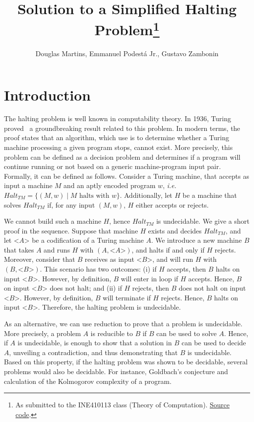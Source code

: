\documentclass[12pt]{article}
\title{Solution to a Simplified Halting Problem\footnote{
    As submitted to the INE410113 class (Theory of Computation). \href{https://github.com/zambonin/ine410113}{Source code}.}}
\author{Douglas Martins\inst{1}, Emmanuel Podestá Jr.\inst{1}, Gustavo Zambonin\inst{1}}
\begin{document}
 

\maketitle

\section{Introduction}\label{sec:intro}

The halting problem is well known in computability theory. In 1936, Turing proved~\cite{Turing:article:1937:jan} a groundbreaking result related to this problem. In modern terms, the proof states that an algorithm, which use is to determine whether a Turing machine processing a given program stops, cannot exist. More precisely, this problem can be defined as a decision problem and determines if a program will continue running or not based on a generic machine-program input pair. Formally, it can be defined as follows. Consider a Turing machine, that accepts as input a machine $M$ and an aptly encoded program $w$, \emph{i.e.} $Halt_{TM} = \{(M, w) \mid M \text{ halts with } w\}$. Additionally, let $H$ be a machine that solves $Halt_{TM}$ if, for any input $(M, w)$, $H$ either accepts or rejects. 

We cannot build such a machine $H$, hence $Halt_{TM}$ is undecidable. We give a short proof in the sequence. Suppose that machine $H$ exists and decides $Halt_{TM}$, and let <$A$> be a codification of a Turing machine $A$. We introduce a new machine $B$ that takes $A$ and runs $H$ with $(A, \text{<}A\text{>})$, and halts if and only if $H$ rejects. Moreover, consider that $B$ receives as input <$B$>, and will run $H$ with $(B, \text{<}B\text{>})$. This scenario has two outcomes: (i) if $H$ accepts, then $B$ halts on input <$B$>. However, by definition, $B$ will enter in loop if $H$ accepts. Hence, $B$ on input <$B$> does not halt; and (ii) if $H$ rejects, then $B$ does not halt on input <$B$>. However, by definition, $B$ will terminate if $H$ rejects. Hence, $B$ halts on input <$B$>. Therefore, the halting problem is undecidable.

As an alternative, we can use reduction to prove that a problem is undecidable. More precisely, a problem $A$ is reducible to $B$ if $B$ can be used to solve $A$. Hence, if $A$ is undecidable, is enough to show that a solution in $B$ can be used to decide $A$, unveiling a contradiction, and thus demonstrating that $B$ is undecidable. Based on this property, if the halting problem was shown to be decidable, several problems would also be decidable. For instance, Goldbach's conjecture and calculation of the Kolmogorov complexity of a program.
\end{document}
